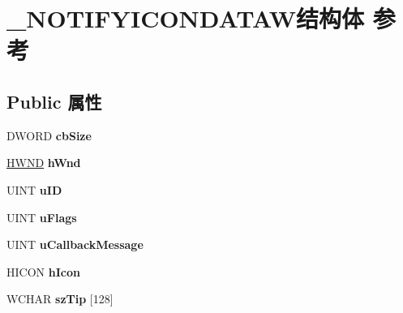 \hypertarget{struct___n_o_t_i_f_y_i_c_o_n_d_a_t_a_w}{}\section{\+\_\+\+N\+O\+T\+I\+F\+Y\+I\+C\+O\+N\+D\+A\+T\+A\+W结构体 参考}
\label{struct___n_o_t_i_f_y_i_c_o_n_d_a_t_a_w}
\subsection*{Public 属性}
\begin{DoxyCompactItemize}
\item 
\mbox{\label{struct___n_o_t_i_f_y_i_c_o_n_d_a_t_a_w_a1eb536eafa638ca0a2e3c1ee6e01b376}} 
D\+W\+O\+RD {\bfseries cb\+Size}
\item 
\mbox{\label{struct___n_o_t_i_f_y_i_c_o_n_d_a_t_a_w_ad5adf385853e5d6a2ef5b1b3bca3c376}} 
\hyperlink{interfacevoid}{H\+W\+ND} {\bfseries h\+Wnd}
\item 
\mbox{\label{struct___n_o_t_i_f_y_i_c_o_n_d_a_t_a_w_a163a6dd4b309b5484ecf7030fed4f7c2}} 
U\+I\+NT {\bfseries u\+ID}
\item 
\mbox{\label{struct___n_o_t_i_f_y_i_c_o_n_d_a_t_a_w_a490c702c9fcd585704f85dfac4d8ea26}} 
U\+I\+NT {\bfseries u\+Flags}
\item 
\mbox{\label{struct___n_o_t_i_f_y_i_c_o_n_d_a_t_a_w_ae698669b2044ad4506560bd695007c9d}} 
U\+I\+NT {\bfseries u\+Callback\+Message}
\item 
\mbox{\label{struct___n_o_t_i_f_y_i_c_o_n_d_a_t_a_w_a3f374769a4edbc93189811a2e530eb45}} 
H\+I\+C\+ON {\bfseries h\+Icon}
\item 
\mbox{\label{struct___n_o_t_i_f_y_i_c_o_n_d_a_t_a_w_a08d70fe5446308bd0d83be1d4cd58591}} 
W\+C\+H\+AR {\bfseries sz\+Tip} \mbox{[}128\mbox{]}
\item 
\mbox{\label{struct___n_o_t_i_f_y_i_c_o_n_d_a_t_a_w_a49a6dc98f0bc0ea78d05b3b8bb1e4a58}} 

\end{DoxyCompactItemize}
